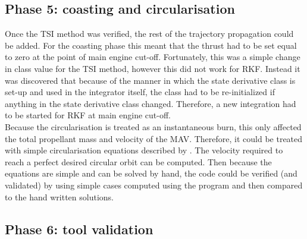 \subsection{Phase 5: coasting and circularisation}
\label{subsec:phase5com}
Once the \ac{TSI} method was verified, the rest of the trajectory propagation could be added. For the coasting phase this meant that the thrust had to be set equal to zero at the point of main engine cut-off. Fortunately, this was a simple change in class value for the \ac{TSI} method, however this did not work for \ac{RKF}. Instead it was discovered that because of the manner in which the state derivative class is set-up and used in the integrator itself, the class had to be re-initialized if anything in the state derivative class changed. Therefore, a new integration had to be started for \ac{RKF} at main engine cut-off. \\

Because the circularisation is treated as an instantaneous burn, this only affected the total propellant mass and velocity of the \ac{MAV}. Therefore, it could be treated with simple circularisation equations described by \cite{wakker2010}. The velocity required to reach a perfect desired circular orbit can be computed. Then because the equations are simple and can be solved by hand, the code could be verified (and validated) by using simple cases computed using the program and then compared to the hand written solutions. 

\subsection{Phase 6: tool validation}
\label{subsec:phase6com}



%
%


